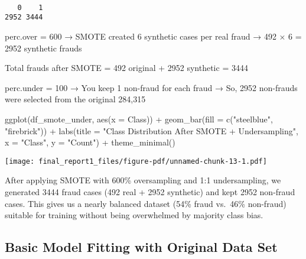 \documentclass[
  11pt,
  letterpaper,
  DIV=11,
  numbers=noendperiod]{scrartcl}
\newenvironment{Shaded}{}{}
\newcommand{\AttributeTok}[1]{\textcolor[rgb]{0.84,0.23,0.29}{#1}}
\newcommand{\FunctionTok}[1]{\textcolor[rgb]{0.44,0.26,0.76}{#1}}
\newcommand{\NormalTok}[1]{\textcolor[rgb]{0.14,0.16,0.18}{#1}}
\newcommand{\SpecialCharTok}[1]{\textcolor[rgb]{0.00,0.36,0.77}{#1}}
\newcommand{\StringTok}[1]{\textcolor[rgb]{0.01,0.18,0.38}{#1}}
\begin{document}
\begin{verbatim}

   0    1 
2952 3444 
\end{verbatim}

perc.over = 600 → SMOTE created 6 synthetic cases per real fraud → 492 ×
6 = 2952 synthetic frauds

Total frauds after SMOTE = 492 original + 2952 synthetic = 3444

perc.under = 100 → You keep 1 non-fraud for each fraud → So, 2952
non-frauds were selected from the original 284,315

\begin{Shaded}
\begin{Highlighting}[]
\FunctionTok{ggplot}\NormalTok{(df\_smote\_under, }\FunctionTok{aes}\NormalTok{(}\AttributeTok{x =}\NormalTok{ Class)) }\SpecialCharTok{+}
  \FunctionTok{geom\_bar}\NormalTok{(}\AttributeTok{fill =} \FunctionTok{c}\NormalTok{(}\StringTok{"steelblue"}\NormalTok{, }\StringTok{"firebrick"}\NormalTok{)) }\SpecialCharTok{+}
  \FunctionTok{labs}\NormalTok{(}\AttributeTok{title =} \StringTok{"Class Distribution After SMOTE + Undersampling"}\NormalTok{, }\AttributeTok{x =} \StringTok{"Class"}\NormalTok{, }\AttributeTok{y =} \StringTok{"Count"}\NormalTok{) }\SpecialCharTok{+}
  \FunctionTok{theme\_minimal}\NormalTok{()}
\end{Highlighting}
\end{Shaded}

\texttt{[image: final\_report1\_files/figure-pdf/unnamed-chunk-13-1.pdf]}

After applying SMOTE with 600\% oversampling and 1:1 undersampling, we
generated 3444 fraud cases (492 real + 2952 synthetic) and kept 2952
non-fraud cases. This gives us a nearly balanced dataset (54\% fraud
vs.~46\% non-fraud) suitable for training without being overwhelmed by
majority class bias.

\subsection{Basic Model Fitting with Original Data
Set}\label{basic-model-fitting-with-original-data-set}
\end{document}
